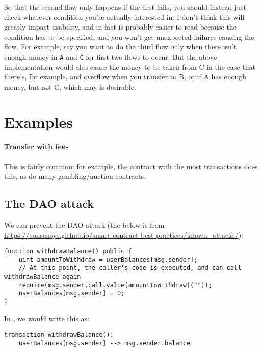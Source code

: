 \documentclass[10pt]{article}
\begin{document}
So that the second flow only happens if the first fails, you should instead just check whatever condition you're actually interested in.
I don't think this will greatly impact usability, and in fact is probably easier to read because the condition has to be specified, and you won't get unexpected failures causing the flow.
For example, say you want to do the third flow only when there isn't enough money in \lstinline{A} and \lstinline{C} for first two flows to occur.
But the above implementation would also cause the money to be taken from C in the case that there's, for example, and overflow when you transfer to B, or if A has enough money, but not C, which may is desirable.

\section{Examples}
\paragraph{Transfer with fees}
This is fairly common: for example, the contract with the most transactions does this, as do many gambling/auction contracts.

\subsection{The DAO attack}
We can prevent the DAO attack (the below is from \url{https://consensys.github.io/smart-contract-best-practices/known_attacks/}):
\begin{lstlisting}
function withdrawBalance() public {
    uint amountToWithdraw = userBalances[msg.sender];
    // At this point, the caller's code is executed, and can call withdrawBalance again
    require(msg.sender.call.value(amountToWithdraw)(""));
    userBalances[msg.sender] = 0;
}
\end{lstlisting}

In \langName, we would write this as:

\begin{lstlisting}
transaction withdrawBalance():
    userBalances[msg.sender] --> msg.sender.balance
\end{lstlisting}
\end{document}
